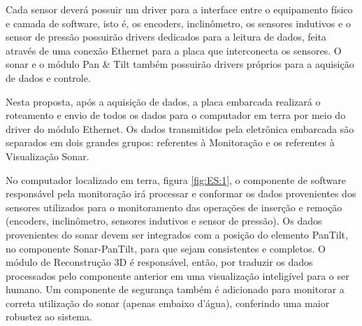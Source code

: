 
Cada sensor deverá possuir um driver para a interface entre o equipamento físico
e camada de software, isto é, os encoders, inclinômetro, os sensores indutivos e
o sensor de pressão possuirão drivers dedicados para a leitura de dados, feita
através de uma conexão Ethernet para a placa que interconecta os sensores. O
sonar e o módulo Pan \& Tilt também possuirão drivers próprios para a aquisição
de dados e controle.

Nesta proposta, após a aquisição de dados, a placa embarcada realizará o
roteamento e envio de todos os dados para o computador em terra por meio do
driver do módulo Ethernet.  Os dados transmitidos pela eletrônica embarcada são
separados em dois grandes grupos: referentes à Monitoração e os referentes à
Visualização Sonar.

No computador localizado em terra, figura \ref{fig:ES:1}, o componente de
software responsável pela monitoração irá processar e conformar os dados
provenientes dos sensores utilizados para o monitoramento das operações de
inserção e remoção (encoders, inclinômetro, sensores indutivos e sensor de
pressão). Os dados provenientes do sonar devem ser integrados com a posição do
elemento PanTilt, no componente Sonar-PanTilt, para que sejam consistentes e
completos.  O módulo de Reconstrução 3D é responsável, então, por traduzir os
dados processados pelo componente anterior em uma visualização inteligível para
o ser humano.  Um componente de segurança também é adicionado para monitorar a
correta utilização do sonar (apenas embaixo d’água), conferindo uma maior
robustez ao sistema.

